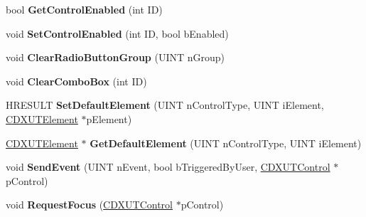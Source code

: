 \begin{DoxyCompactItemize}
\item 
\hypertarget{class_c_d_x_u_t_dialog_a274fa05f0de8b86856434f1f1a93409e}{bool {\bfseries Get\+Control\+Enabled} (int I\+D)}\label{class_c_d_x_u_t_dialog_a274fa05f0de8b86856434f1f1a93409e}

\item 
\hypertarget{class_c_d_x_u_t_dialog_a38467fd37877a472214cc2b6e95c0059}{void {\bfseries Set\+Control\+Enabled} (int I\+D, bool b\+Enabled)}\label{class_c_d_x_u_t_dialog_a38467fd37877a472214cc2b6e95c0059}

\item 
\hypertarget{class_c_d_x_u_t_dialog_a1d65298121be1454bf5a3b945d19d6e4}{void {\bfseries Clear\+Radio\+Button\+Group} (U\+I\+N\+T n\+Group)}\label{class_c_d_x_u_t_dialog_a1d65298121be1454bf5a3b945d19d6e4}

\item 
\hypertarget{class_c_d_x_u_t_dialog_a339029982b93647d9a2d3729066b09da}{void {\bfseries Clear\+Combo\+Box} (int I\+D)}\label{class_c_d_x_u_t_dialog_a339029982b93647d9a2d3729066b09da}

\item 
\hypertarget{class_c_d_x_u_t_dialog_ad509ffcb58000556545e337cbba2e656}{H\+R\+E\+S\+U\+L\+T {\bfseries Set\+Default\+Element} (U\+I\+N\+T n\+Control\+Type, U\+I\+N\+T i\+Element, \hyperlink{class_c_d_x_u_t_element}{C\+D\+X\+U\+T\+Element} $\ast$p\+Element)}\label{class_c_d_x_u_t_dialog_ad509ffcb58000556545e337cbba2e656}

\item 
\hypertarget{class_c_d_x_u_t_dialog_ac77892923ec7d9b8838b745c3937e8db}{\hyperlink{class_c_d_x_u_t_element}{C\+D\+X\+U\+T\+Element} $\ast$ {\bfseries Get\+Default\+Element} (U\+I\+N\+T n\+Control\+Type, U\+I\+N\+T i\+Element)}\label{class_c_d_x_u_t_dialog_ac77892923ec7d9b8838b745c3937e8db}

\item 
\hypertarget{class_c_d_x_u_t_dialog_a8f4afe62626f97855d35438db64c527a}{void {\bfseries Send\+Event} (U\+I\+N\+T n\+Event, bool b\+Triggered\+By\+User, \hyperlink{class_c_d_x_u_t_control}{C\+D\+X\+U\+T\+Control} $\ast$p\+Control)}\label{class_c_d_x_u_t_dialog_a8f4afe62626f97855d35438db64c527a}

\item 
\hypertarget{class_c_d_x_u_t_dialog_ad5af120ffc7df861267194e00a7b75ca}{void {\bfseries Request\+Focus} (\hyperlink{class_c_d_x_u_t_control}{C\+D\+X\+U\+T\+Control} $\ast$p\+Control)}\label{class_c_d_x_u_t_dialog_ad5af120ffc7df861267194e00a7b75ca}


\end{DoxyCompactItemize}
